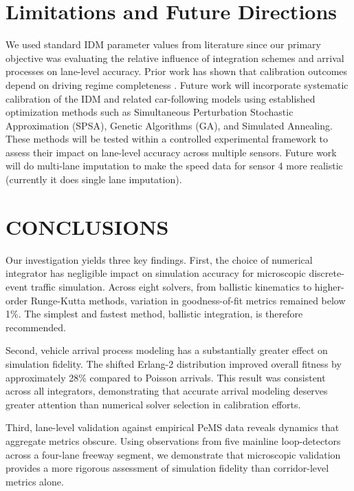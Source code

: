 \documentclass{scspaperproc}
\theoremstyle{scsthe}
\begin{document}
\section{Limitations and Future Directions}

We used standard IDM parameter values from literature since our primary   
objective was evaluating the relative influence of integration schemes and 
arrival processes on lane-level accuracy. Prior work has shown that 
calibration outcomes depend on driving regime completeness 
\cite{sharma2019more}. Future work will incorporate systematic 
calibration of the IDM and related car-following models using established optimization 
methods such as Simultaneous Perturbation Stochastic Approximation (SPSA), Genetic 
Algorithms (GA), and Simulated Annealing. These methods will be tested within a controlled experimental framework to assess their impact on lane-level accuracy across multiple sensors. Future work will do multi-lane imputation to make the speed data for sensor 4 more realistic (currently it does single lane imputation). 

\section{CONCLUSIONS}
\label{sec:conclusions}
Our investigation yields three key findings. First, the choice of numerical integrator 
has negligible impact on simulation accuracy for microscopic discrete-event traffic simulation. Across eight solvers, from ballistic kinematics to higher-order Runge-Kutta methods, variation in goodness-of-fit metrics remained below 1\%. The simplest and fastest method, ballistic integration, is therefore recommended.

Second, vehicle arrival process modeling has a substantially greater effect on simulation fidelity. The shifted Erlang-2 distribution improved overall fitness by approximately 28\% compared to Poisson arrivals. This result was consistent across all integrators, demonstrating that accurate arrival modeling deserves greater attention than numerical solver selection in calibration efforts.

Third, lane-level validation against empirical PeMS data reveals dynamics that aggregate metrics obscure. Using observations from five mainline loop-detectors across a four-lane freeway segment, we demonstrate that microscopic validation provides a more rigorous assessment of simulation fidelity than corridor-level metrics alone.


\appendix
\end{document}
